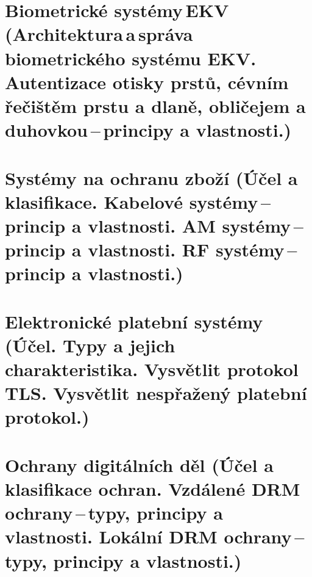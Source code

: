 \clearpage
\section[Biometrické systémy EKV (Architektura a správa biometrického systému EKV. Autentizace otisky prstů, cévním řečištěm prstu a dlaně, obličejem a duhovkou\,--\,principy a vlastnosti.)]{Biometrické systémy\,EKV\,(Architektura\,a\,správa biometrického systému EKV. Autentizace otisky prstů, cévním řečištěm prstu a dlaně, obličejem a duhovkou\,--\,principy a vlastnosti.)}

\clearpage
\section{Systémy na ochranu zboží (Účel a klasifikace. Kabelové systémy\,--\,princip a vlastnosti. AM systémy\,--\,princip a vlastnosti. RF systémy\,--\,princip a vlastnosti.)}

\clearpage
\section{Elektronické platební systémy (Účel. Typy a jejich charakteristika. Vysvětlit protokol TLS. Vysvětlit nespřažený platební protokol.)}

\clearpage
\section{Ochrany digitálních děl (Účel a klasifikace ochran. Vzdálené DRM ochrany\,--\,typy, principy a vlastnosti. Lokální DRM ochrany\,--\,typy, principy a vlastnosti.)}
